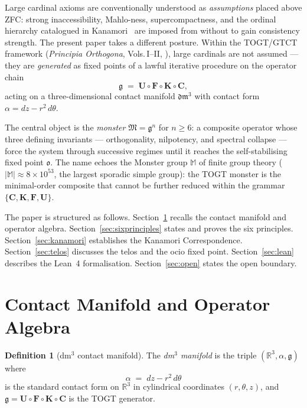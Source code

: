 \documentclass[12pt,a4paper]{amsart}
\theoremstyle{definition}
\newtheorem{definition}[theorem]{Definition}
\theoremstyle{remark}
\newcommand{\Cop}{\mathbf{C}}
\newcommand{\Kop}{\mathbf{K}}
\newcommand{\Fop}{\mathbf{F}}
\newcommand{\Uop}{\mathbf{U}}
\newcommand{\GG}{\mathfrak{g}}
\newcommand{\MM}{\mathfrak{M}}
\newcommand{\dm}{\mathfrak{dm}^3}
\newcommand{\ocio}{\mathfrak{o}}
\begin{document}
Large cardinal axioms are conventionally understood as \emph{assumptions} placed above
ZFC: strong inaccessibility, Mahlo-ness, supercompactness, and the ordinal hierarchy
catalogued in Kanamori~\cite{Kanamori2003} are imposed from without to gain consistency
strength. The present paper takes a different posture. Within the TOGT/GTCT framework
(\emph{Principia Orthogona}, Vols.\,I--II, \cite{Grossi2026PO1,Grossi2026PO2}),
large cardinals are not assumed --- they are \emph{generated} as fixed points of a
lawful iterative procedure on the operator chain
\[
  \GG \;=\; \Uop \circ \Fop \circ \Kop \circ \Cop,
\]
acting on a three-dimensional contact manifold $\dm$ with contact form
$\alpha = dz - r^2\,d\theta$.

The central object is the \emph{monster} $\MM = \GG^n$ for $n \geq 6$:
a composite operator whose three defining invariants --- orthogonality, nilpotency,
and spectral collapse --- force the system through successive regimes until it reaches
the self-stabilising fixed point $\ocio$. The name echoes the Monster group
$\mathbb{M}$ of finite group theory ($|\mathbb{M}| \approx 8 \times 10^{53}$, the
largest sporadic simple group): the TOGT monster is the minimal-order composite that
cannot be further reduced within the grammar $\{\Cop,\Kop,\Fop,\Uop\}$.

The paper is structured as follows.
Section~\ref{sec:manifold} recalls the contact manifold and operator algebra.
Section~\ref{sec:sixprinciples} states and proves the six principles.
Section~\ref{sec:kanamori} establishes the Kanamori Correspondence.
Section~\ref{sec:telos} discusses the telos and the ocio fixed point.
Section~\ref{sec:lean} describes the Lean~4 formalisation.
Section~\ref{sec:open} states the open boundary.

\section{Contact Manifold and Operator Algebra}\label{sec:manifold}

\begin{definition}[dm$^3$ contact manifold]\label{def:dm3}
The \emph{dm$^3$ manifold} is the triple $(\mathbb{R}^3, \alpha, \GG)$ where
\[
  \alpha \;=\; dz - r^2\,d\theta
\]
is the standard contact form on $\mathbb{R}^3$ in cylindrical coordinates
$(r,\theta,z)$, and $\GG = \Uop \circ \Fop \circ \Kop \circ \Cop$ is the
TOGT generator.
\end{definition}
\end{document}
